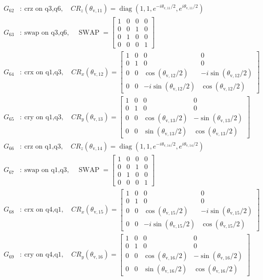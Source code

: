 \begin{align*}
G_{62}&:\ \text{crz on q3,q6},\quad CR_z(\theta_{\mathrm{v},11})=\operatorname{diag}(1,1,e^{-i\theta_{\mathrm{v},11}/2},e^{i\theta_{\mathrm{v},11}/2})\\
G_{63}&:\ \text{swap on q3,q6},\quad \operatorname{SWAP}=\begin{bmatrix}1&0&0&0\\0&0&1&0\\0&1&0&0\\0&0&0&1\end{bmatrix}\\
G_{64}&:\ \text{crx on q1,q3},\quad CR_x(\theta_{\mathrm{v},12})=\begin{bmatrix}1&0&0&0\\0&1&0&0\\0&0&\cos(\theta_{\mathrm{v},12}/2)&-i\sin(\theta_{\mathrm{v},12}/2)\\0&0&-i\sin(\theta_{\mathrm{v},12}/2)&\cos(\theta_{\mathrm{v},12}/2)\end{bmatrix}\\
G_{65}&:\ \text{cry on q1,q3},\quad CR_y(\theta_{\mathrm{v},13})=\begin{bmatrix}1&0&0&0\\0&1&0&0\\0&0&\cos(\theta_{\mathrm{v},13}/2)&-\sin(\theta_{\mathrm{v},13}/2)\\0&0&\sin(\theta_{\mathrm{v},13}/2)&\cos(\theta_{\mathrm{v},13}/2)\end{bmatrix}\\
G_{66}&:\ \text{crz on q1,q3},\quad CR_z(\theta_{\mathrm{v},14})=\operatorname{diag}(1,1,e^{-i\theta_{\mathrm{v},14}/2},e^{i\theta_{\mathrm{v},14}/2})\\
G_{67}&:\ \text{swap on q1,q3},\quad \operatorname{SWAP}=\begin{bmatrix}1&0&0&0\\0&0&1&0\\0&1&0&0\\0&0&0&1\end{bmatrix}\\
G_{68}&:\ \text{crx on q4,q1},\quad CR_x(\theta_{\mathrm{v},15})=\begin{bmatrix}1&0&0&0\\0&1&0&0\\0&0&\cos(\theta_{\mathrm{v},15}/2)&-i\sin(\theta_{\mathrm{v},15}/2)\\0&0&-i\sin(\theta_{\mathrm{v},15}/2)&\cos(\theta_{\mathrm{v},15}/2)\end{bmatrix}\\
G_{69}&:\ \text{cry on q4,q1},\quad CR_y(\theta_{\mathrm{v},16})=\begin{bmatrix}1&0&0&0\\0&1&0&0\\0&0&\cos(\theta_{\mathrm{v},16}/2)&-\sin(\theta_{\mathrm{v},16}/2)\\0&0&\sin(\theta_{\mathrm{v},16}/2)&\cos(\theta_{\mathrm{v},16}/2)\end{bmatrix}\\

\end{align*}

